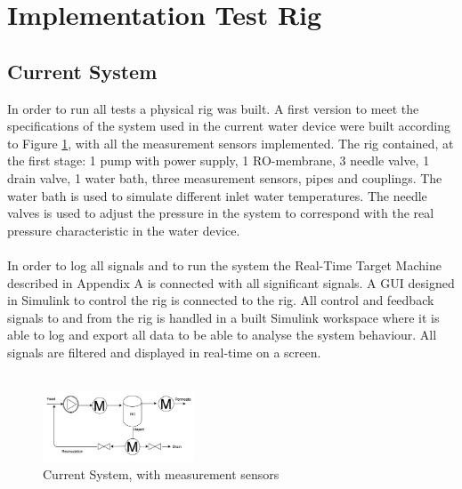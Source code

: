 \section{Implementation Test Rig}
\subsection{Current System}
In order to run all tests a physical rig was built. A first version to meet the specifications of the system used in the current water device were built according to Figure \ref{fig:MeasCurrSys}, with all the measurement sensors implemented. The rig contained, at the first stage: 1 pump with power supply, 1 RO-membrane, 3 needle valve, 1 drain valve, 1 water bath, three measurement sensors, pipes and couplings. The water bath is used to simulate different inlet water temperatures. The needle valves is used to adjust the pressure in the system to correspond with the real pressure characteristic in the water device. \\
\\
In order to log all signals and to run the system the Real-Time Target Machine described in Appendix A is connected with all significant signals. A GUI designed in Simulink to control the rig is connected to the rig. All control and feedback signals to and from the rig is handled in a built Simulink workspace where it is able to log and export all data to be able to analyse the system behaviour. All signals are filtered and displayed in real-time on a screen. \\
\\

\begin{figure}[h]
    \centering
    \includegraphics[width=0.4\textwidth]{MeasCurrSys}
    \caption{Current System, with measurement sensors}
    \label{fig:MeasCurrSys}
\end{figure}

